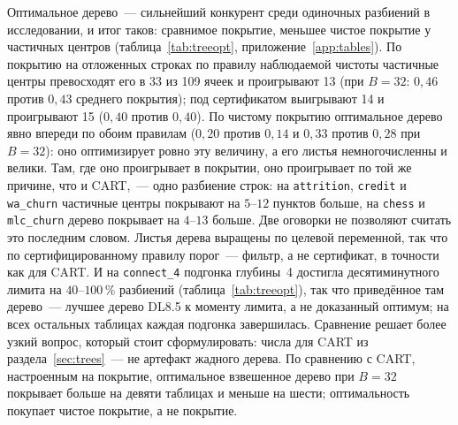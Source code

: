 \documentclass[11pt]{article}
\begin{document}
Оптимальное дерево~--- сильнейший конкурент среди одиночных разбиений в исследовании, и итог таков: сравнимое покрытие, меньшее чистое покрытие у частичных центров (таблица~\ref{tab:treeopt}, приложение~\ref{app:tables}). По покрытию на отложенных строках по правилу наблюдаемой чистоты частичные центры превосходят его в 33 из 109 ячеек и проигрывают 13 (при $B=32$: $0{,}46$ против $0{,}43$ среднего покрытия); под сертификатом выигрывают 14 и проигрывают 15 ($0{,}40$ против $0{,}40$). По чистому покрытию оптимальное дерево явно впереди по обоим правилам ($0{,}20$ против $0{,}14$ и $0{,}33$ против $0{,}28$ при $B=32$): оно оптимизирует ровно эту величину, а его листья немногочисленны и велики. Там, где оно проигрывает в покрытии, оно проигрывает по той же причине, что и CART,~--- одно разбиение строк: на \texttt{attrition}, \texttt{credit} и \texttt{wa\_churn} частичные центры покрывают на $5$--$12$ пунктов больше, на \texttt{chess} и \texttt{mlc\_churn} дерево покрывает на $4$--$13$ больше. Две оговорки не позволяют считать это последним словом. Листья дерева выращены по целевой переменной, так что по сертифицированному правилу порог~--- фильтр, а не сертификат, в точности как для CART. И на \texttt{connect\_4} подгонка глубины~4 достигла десятиминутного лимита на $40$--$100\,\%$ разбиений (таблица~\ref{tab:treeopt}), так что приведённое там дерево~--- лучшее дерево DL8.5 к моменту лимита, а не доказанный оптимум; на всех остальных таблицах каждая подгонка завершилась. Сравнение решает более узкий вопрос, который стоит сформулировать: числа для CART из раздела~\ref{sec:trees}~--- не артефакт жадного дерева. По сравнению с CART, настроенным на покрытие, оптимальное взвешенное дерево при $B=32$ покрывает больше на девяти таблицах и меньше на шести; оптимальность покупает чистое покрытие, а не покрытие.
\end{document}
